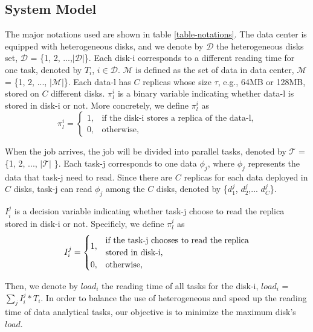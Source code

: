 \documentclass[conference]{IEEEtran}
\makeatletter
\newcommand{\tabincell}[2]{\begin{tabular}{@{}#1@{}}#2\end{tabular}}
\makeatother
\begin{document}
\subsection{System Model}

The major notations used are shown in table \ref{table-notations}. The data center is equipped with heterogeneous disks, and we denote by $\mathcal{D}$ the heterogeneous disks set, $\mathcal{D}$ = \{1, 2, ...,$|\mathcal{D}|$\}. Each disk-i corresponds to a different reading time for one task, denoted by $T_i$, $i \in \mathcal{D}$.
$\mathcal{M}$ is defined as the set of data in data center, $\mathcal{M}$ = \{1, 2, ..., $|\mathcal{M}|$\}. Each data-l has $C$ replicas whose size $\tau$, e.g., 64MB or 128MB,  stored on $C$ different disks. $\pi_l^{i}$ is a binary variable indicating whether data-l is stored in disk-i or not. More concretely, we define $\pi_l^{i}$ as
\begin{equation}
\pi_l^{i} =
\begin{cases}
1, &\text{if the disk-i stores a replica of the data-l,}\\
0, &\text{otherwise,}
\end{cases}\nonumber
\end{equation}

When the job arrives, the job will be divided into parallel tasks, denoted by $\mathcal{T}$ = \{1, 2,  ..., $\mathcal{|T|}$ \}. Each task-j corresponds to one data $\phi_j$, where $\phi_{j}$ represents the data that task-j need to read. Since there are $C$ replicas for each data deployed in $C$ disks, task-j can read $\phi_j$ among the $C$ disks, denoted by \{$d_{1}^j$, $d_{2}^j$,... $d_{C}^j$\}.


$I_i^j$ is a decision variable indicating whether task-j choose to read the replica stored in disk-i or not. Specificly, we define $\pi_l^{i}$ as
\begin{equation}
I_i^j =
\begin{cases}
1, &\text{\tabincell{l}{if the task-j chooses to read the replica \\stored in disk-i,}}\\
0, &\text{otherwise,}
\end{cases}\nonumber
\end{equation}

Then, we denote by $load_i$ the reading time of all tasks for the disk-i, $load_{i}$ = $\sum_{j}I_i^j*T_i$. In order to balance the use of heterogeneous and speed up the reading time of data analytical tasks, our objective is to minimize the maximum disk's $load$.
\end{document}
